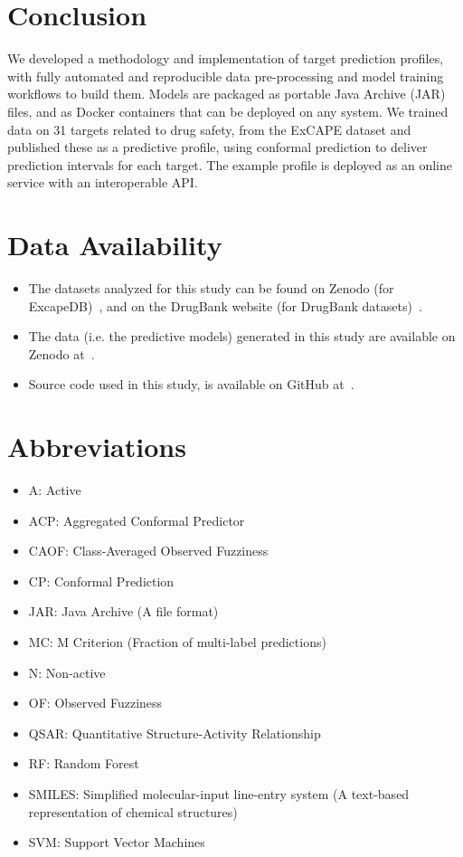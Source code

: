 \documentclass[10pt,article]{memoir}
\begin{document}
\section*{Conclusion}
We developed a methodology and implementation of target prediction profiles,
with fully automated and reproducible data pre-processing and model training
workflows to build them. Models are packaged as portable Java Archive (JAR)
files, and as Docker containers that can be deployed on any system. We trained
data on 31 targets related to drug safety, from the ExCAPE dataset and published
these as a predictive profile, using conformal prediction to deliver prediction
intervals for each target. The example profile is deployed as an online service
with an interoperable API.



\section*{Data Availability}

\begin{itemize}
    \item The datasets analyzed for this study can be found on Zenodo (for
        ExcapeDB)~\cite{ExcapeDBZenodo}, and on the DrugBank website (for
        DrugBank datasets)~\cite{DrugBankWebsite}.
    \item The data (i.e. the predictive models) generated in this study are
        available on Zenodo at~\cite{ModelsZenodo}.
    \item Source code used in this study, is available on GitHub
        at~\cite{PTPGitHub}.
\end{itemize}

\newpage

\section*{Abbreviations}

\begin{itemize}
    \item A: Active
    \item ACP: Aggregated Conformal Predictor
    \item CAOF: Class-Averaged Observed Fuzziness
    \item CP: Conformal Prediction
    \item JAR: Java Archive (A file format)
    \item MC: M Criterion (Fraction of multi-label predictions)
    \item N: Non-active
    \item OF: Observed Fuzziness
    \item QSAR: Quantitative Structure-Activity Relationship
    \item RF: Random Forest
    \item SMILES: Simplified molecular-input line-entry system (A text-based representation of chemical structures)
    \item SVM: Support Vector Machines
\end{itemize}
\end{document}
